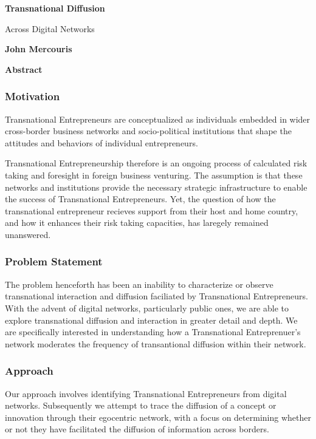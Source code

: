 \thispagestyle{plain}
\begin{center}
    \Large
    \textbf{Transnational Diffusion}
    
    \vspace{0.4cm}
    \large
    Across Digital Networks
    
    \vspace{0.4cm}
    \textbf{John Mercouris}
    
    \vspace{0.9cm}
    \textbf{Abstract}
\end{center}

\subsubsection{Motivation}
Transnational Entrepreneurs are conceptualized as individuals embedded
in wider cross-border business networks and socio-political
institutions that shape the attitudes and behaviors of individual
entrepreneurs.

Transnational Entrepreneurship therefore is an ongoing process of
calculated risk taking and foresight in foreign business
venturing. The assumption is that these networks and institutions
provide the necessary strategic infrastructure to enable the success
of Transnational Entrepreneurs. Yet, the question of how the
transnational entrepreneur recieves support from their host and home
country, and how it enhances their risk taking capacities, has
laregely remained unanswered.

\subsubsection{Problem Statement}
The problem henceforth has been an inability to characterize or
observe transnational interaction and diffusion faciliated by
Transnational Entrepreneurs. With the advent of digital networks,
particularly public ones, we are able to explore transnational
diffusion and interaction in greater detail and depth. We are
specifically interested in understanding how a Transnational
Entreprenuer's network moderates the frequency of transantional
diffusion within their network.

\subsubsection{Approach}
Our approach involves identifying Transnational Entrepreneurs from
digital networks. Subsequently we attempt to trace the diffusion of a
concept or innovation through their egocentric network, with a focus
on determining whether or not they have facilitated the diffusion of
information across borders.

